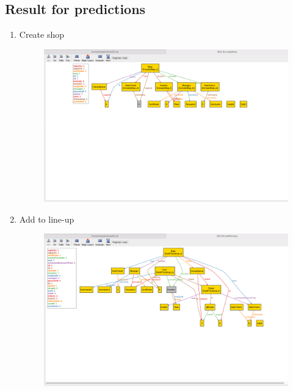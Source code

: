 \subsection{Result for predictions}
\begin{enumerate}
	\item Create shop \\
	\begin{figure}[H]
		\centering
		\includegraphics[width=0.9\textheight,keepaspectratio, angle=90]{images/alloy_createShop.png}
	\end{figure}
	\clearpage

	\item Add to line-up \\
	\begin{figure}[H]
		\centering
		\includegraphics[width=0.9\textheight,keepaspectratio, angle=90]{images/alloy_addToLineup.png}
	\end{figure}
	\clearpage


\end{enumerate}
